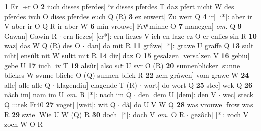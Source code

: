\documentclass[8pt,a4paper,notitlepage]{article}
\begin{document}
\begin{table}[ht]
\begin{minipage}[t]{0.5\linewidth}
\textbf{1} Er] ÷r O \textbf{2} iuch disses pferdes] îv disses pferdes T daz pfert nicht W des pferdes ivch O dises pferdes euch Q (R) \textbf{3} ez enwert] Zu wert Q \textbf{4} ir] [i*]: aber ir V aber ir O Q R ir aber W \textbf{6} mîn vrouwe] Frvͦ minne O \textbf{7} manegen] \textit{om.} Q \textbf{9} Gawan] Gawin R  $\cdot$ ern liezes] [er*]: ern liezes V ich en laze ez O er enlies sin R \textbf{10} waz] das W Q (R) des O  $\cdot$ dan] da mit R \textbf{11} grâwe] [*]: grawe U graffe Q \textbf{13} sult niht] ensúlt nit W sultt mit R \textbf{14} diz] daz O \textbf{15} gesalzen] versalzen V \textbf{16} gebiu] gebe U \textbf{17} iuch] iv T \textbf{19} alsûr] also suͦr U svr O (R) \textbf{20} sunnenblicker] sunne blickes W svnne bliche O (Q) sunnen blick R \textbf{22} zem grâwen] vom grawe W \textbf{24} alle] alle alle Q  $\cdot$ klagendiu] clagende T (R)  $\cdot$ wort] do wort Q \textbf{25} stec] wek Q \textbf{26} nâch im] nam im U \textit{om.} R [*]: nach im Q  $\cdot$ den] dem U [dem]: den V  $\cdot$ wec] steck Q :::tek Fr40 \textbf{27} voget] [weit]: wit Q  $\cdot$ dâ] do U V W Q \textbf{28} was vrouwe] frow was R \textbf{29} swie] Wie U W (Q) R \textbf{30} doch] [*]: doch V \textit{om.} O R  $\cdot$ gezôch] [*]: zoch V zoch W O R \newline
\end{minipage}
\end{table}
\end{document}
